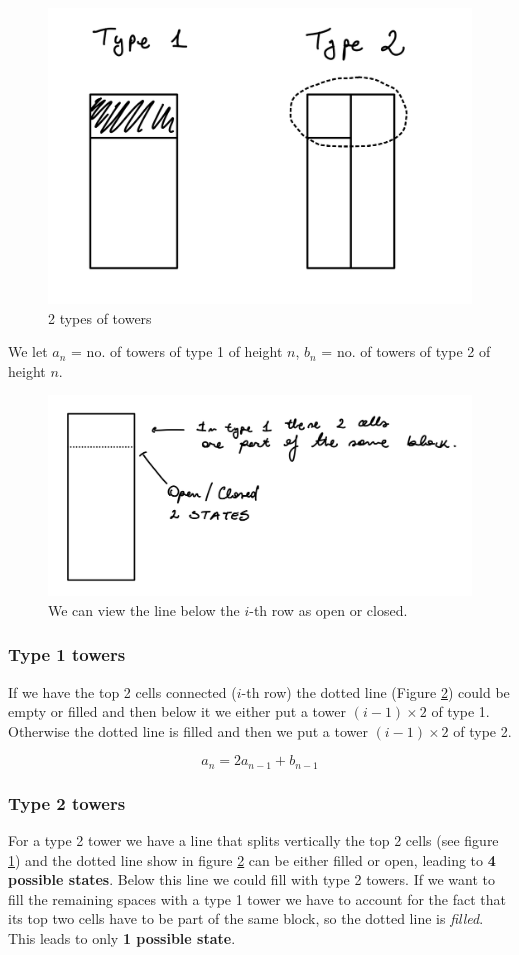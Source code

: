 \begin{figure}[!ht]
    \centering
    \includegraphics[width=0.5\linewidth]{Pictures/2-1.png}
    \caption{2 types of towers}
    \label{fig:21}
\end{figure}

We let $a_n$ = no. of towers of type 1 of height $n$, $b_n$ = no. of towers of type 2 of height $n$.

\begin{figure}[!ht]
    \centering
    \includegraphics[width=0.75\linewidth]{Pictures/2-2.png}
    \caption{We can view the line below the $i$-th row as open or closed.}
    \label{fig:22}
\end{figure}

\subsubsection{Type 1 towers}
If we have the top 2 cells connected ($i$-th row) the dotted line (Figure \ref{fig:22}) could be empty or filled and then below it we either put a tower $(i - 1) \times 2$ of type 1. Otherwise the dotted line is filled and then we put a tower $(i - 1) \times 2$ of type 2.

\begin{equation}
    a_n = 2a_{n-1} + b_{n-1}
\end{equation}

\subsubsection{Type 2 towers}
For a type 2 tower we have a line that splits vertically the top 2 cells (see figure \ref{fig:21}) and the dotted line show in figure \ref{fig:22} can be either filled or open, leading to \textbf{4 possible states}. Below this line we could fill with type 2 towers. If we want to fill the remaining spaces with a type 1 tower we have to account for the fact that its top two cells have to be part of the same block, so the dotted line is \textit{filled}. This leads to only \textbf{1 possible state}.

